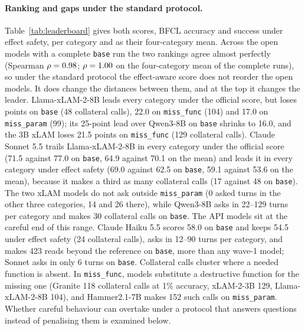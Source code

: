 \documentclass{article}
\newcommand{\cls}[1]{\texttt{#1}}
\begin{document}
\begin{table}[t]
\centering\small\setlength{\tabcolsep}{4pt}
\caption{Leaderboard under the standard protocol.}
\label{tab:leaderboard}

\end{table}

\begin{table}[t]
\centering\small\setlength{\tabcolsep}{3pt}
\caption{Rule violations and token use on \cls{base}.}
\label{tab:behaviour}
\resizebox{\textwidth}{!}{}
\end{table}

\paragraph{Ranking and gaps under the standard protocol.} Table~\ref{tab:leaderboard} gives both scores, BFCL accuracy
and success under effect safety, per category and as their four-category mean. Across the
\nLeaderboardBase{} open models with a complete \cls{base} run the two rankings agree almost perfectly (Spearman
$\rho=0.98$; $\rho=1.00$ on the four-category mean of the \nLeaderboardFull{} complete runs), so under
the standard protocol the effect-aware score does not reorder the open models. It does change the distances between
them, and at the top it changes the leader. Llama-xLAM-2-8B leads every category under the official score, but loses
\largestDrop{} points on \cls{base} (48 collateral calls), 22.0 on \cls{miss\_func} (104) and 17.0 on \cls{miss\_param}
(99); its 25-point lead over Qwen3-8B on \cls{base} shrinks to 16.0, and the 3B xLAM loses 21.5 points on
\cls{miss\_func} (129 collateral calls). Claude Sonnet 5.5 trails Llama-xLAM-2-8B in every category under the official
score (71.5 against 77.0 on \cls{base}, 64.9 against 70.1 on the mean) and leads it in every category under effect
safety (69.0 against 62.5 on \cls{base}, 59.1 against 53.6 on the mean), because it makes a third as many collateral
calls (17 against 48 on \cls{base}). The two xLAM models do not
ask outside \cls{miss\_param} (0 asked turns in the other three categories, 14 and 26 there), while Qwen3-8B asks in
22--129 turns per category and makes 30 collateral calls on \cls{base}. The API models sit at the careful end of this
range. Claude Haiku 5.5 scores 58.0 on \cls{base} and keeps 54.5 under effect safety (24 collateral calls), asks in
12--90 turns per category, and makes 423 reads beyond the reference on \cls{base}, more than any wave-1 model; Sonnet asks
in only 6 turns on \cls{base}. Collateral
calls cluster where a needed function is absent. In \cls{miss\_func}, models substitute a destructive function for the
missing one (Granite 118 collateral calls at 1\% accuracy, xLAM-2-3B 129, Llama-xLAM-2-8B 104), and Hammer2.1-7B makes 152
such calls on \cls{miss\_param}. Whether careful behaviour can overtake under a protocol that answers questions instead of
penalising them is examined below.
\end{document}
